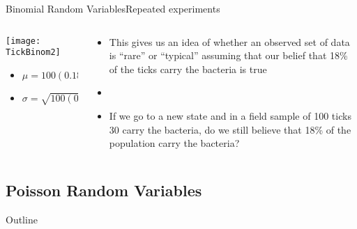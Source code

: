 \documentclass[xcolor=dvipsnames]{beamer}
\begin{document}
\begin{frame}{Binomial Random Variables}{Repeated experiments}
	\begin{columns}
		\begin{column}{0.5 \textwidth}
				\begin{center}
				\texttt{[image: TickBinom2]}
			\end{center}
		\begin{itemize}
			\item $\mu = 100 (0.18) = 18$
			\item $\sigma = \sqrt{100 (0.18) (1-0.18)} = 3.842$
		\end{itemize}
		\end{column}
		\begin{column}{0.5 \textwidth}
			\begin{itemize}
				\item This gives us an idea of whether an observed set of data is ``rare'' or ``typical'' assuming that our belief that 18\% of the ticks carry the bacteria is true
				\item[]
				\item If we go to a new state and in a field sample of 100 ticks 30 carry the bacteria, do we still believe that 18\% of the population carry the bacteria?
			\end{itemize}
		\end{column}
	\end{columns}
\end{frame}

\subsection{Poisson Random Variables}
\begin{frame}{Outline}
	\tableofcontents[currentsection,subsectionstyle=show/shaded/hide]
\end{frame}
\end{document}
